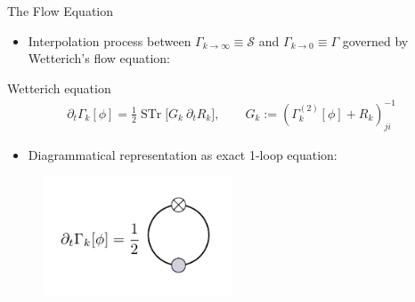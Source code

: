 \documentclass{beamer}
\begin{document}
\begin{frame}{The Flow Equation}
\vspace{0.6cm}
\begin{itemize}
	\item Interpolation process between $\Gamma_{k\rightarrow\infty}\equiv\mathcal{S}$ and $\Gamma_{k\rightarrow 0}\equiv\Gamma$ governed by Wetterich's flow equation:
\end{itemize}
\begin{block}{Wetterich equation}
\begin{align}
		\partial_t\Gamma_k[\phi] = \frac{1}{2}\operatorname{STr}\bigl[G_k\ \partial_tR_k \bigr], \qquad G_k := \left(\Gamma^{(2)}_k[\phi] + R_k\right)^{-1}_{ji}
	\end{align}	
\end{block}

\begin{itemize}
\item Diagrammatical representation as exact 1-loop equation:
\end{itemize}
\vspace{-0.6cm}
\begin{figure}
	\centering
	\includegraphics[width=0.5\textwidth]{figures/flow_eqn2}
\end{figure}

\end{frame}
\end{document}
